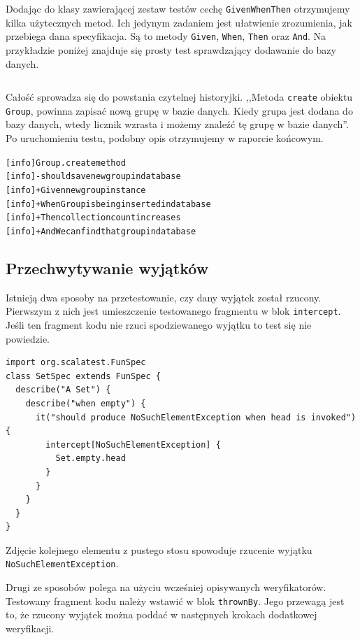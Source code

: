 \documentclass[brudnopis]{xmgr}
\begin{document}
Dodając do klasy zawierającej zestaw testów cechę \texttt{GivenWhenThen} otrzymujemy kilka użytecznych metod. Ich jedynym zadaniem jest ułatwienie zrozumienia, jak przebiega dana specyfikacja. Są to metody \texttt{Given}, \texttt{When}, \texttt{Then} oraz \texttt{And}. Na przykładzie poniżej znajduje się prosty test sprawdzający dodawanie do bazy danych.

\inputminted[fontsize=\small]{scala}{code/givenWhenThen.scala}

Całość sprowadza się do powstania czytelnej historyjki. ,,Metoda \texttt{create} obiektu \texttt{Group}, powinna zapisać nową grupę w bazie danych. Kiedy grupa jest dodana do bazy danych, wtedy licznik wzrasta i możemy znaleźć tę grupę w bazie danych''. Po uruchomieniu testu, podobny opis otrzymujemy w raporcie końcowym. 

\begin{alltt}
[info] Group.create method
[info] - should save new group in database
[info]   + Given new group instance
[info]   + When Group is being inserted in database 
[info]   + Then collection count increases 
[info]   + And We can find that group in database
\end{alltt}

\subsection{Przechwytywanie wyjątków}

Istnieją dwa sposoby na przetestowanie, czy dany wyjątek został rzucony. Pierwszym z nich jest umieszczenie testowanego fragmentu w blok \texttt{intercept}. Jeśli ten fragment kodu nie rzuci spodziewanego wyjątku to test się nie powiedzie.

\begin{verbatim}
import org.scalatest.FunSpec
class SetSpec extends FunSpec {
  describe("A Set") {
    describe("when empty") {
      it("should produce NoSuchElementException when head is invoked") {
        intercept[NoSuchElementException] {
          Set.empty.head
        }
      }
    }
  }
}
\end{verbatim}

Zdjęcie kolejnego elementu z pustego stosu spowoduje rzucenie wyjątku \texttt{NoSuchElementException}.

Drugi ze sposobów polega na użyciu wcześniej opisywanych weryfikatorów. Testowany fragment kodu należy wstawić w blok \texttt{thrownBy}. Jego przewagą jest to, że rzucony wyjątek można poddać w następnych krokach dodatkowej weryfikacji.
\end{document}
